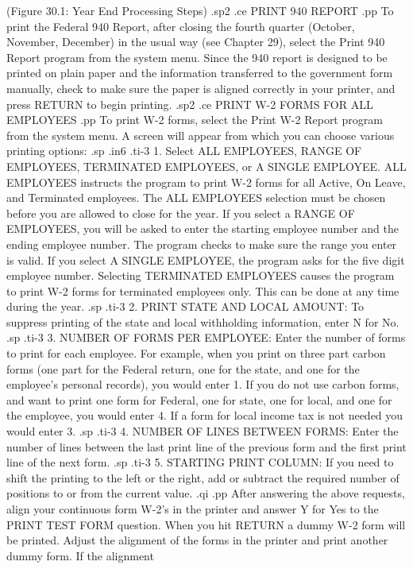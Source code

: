 	      (Figure 30.1: Year End Processing Steps)
.sp2
.ce
PRINT 940 REPORT
.pp
To print the Federal 940 Report, after
closing the fourth quarter (October, November, December) in the usual
way (see Chapter 29), select the Print 940 Report program from the system
menu.  Since the 940 report is designed to be printed on plain paper and
the information
transferred to the government form manually, check to make sure the
paper is aligned correctly in your printer, and press RETURN to begin
printing.
.sp2
.ce
PRINT W-2 FORMS FOR ALL EMPLOYEES
.pp
To print W-2 forms, select the Print W-2 Report program from the system
menu.  A screen will appear from which you can choose various printing
options:
.sp
.in6
.ti-3
1. Select ALL EMPLOYEES, RANGE OF EMPLOYEES, TERMINATED EMPLOYEES, or
A SINGLE EMPLOYEE.  ALL EMPLOYEES instructs the program to print W-2
forms for all Active, On Leave, and Terminated employees.  The ALL
EMPLOYEES selection must be chosen before you are allowed to close for
the year.
If you
select a RANGE OF EMPLOYEES, you will be asked to enter the starting
employee number and the ending employee number.  The program checks
to make sure the range you enter is valid.  If you select A SINGLE
EMPLOYEE, the program asks for the five digit employee number. Selecting
TERMINATED EMPLOYEES causes the program to print W-2 forms for terminated
employees only. This can be done at any time during the year.
.sp
.ti-3
2. PRINT STATE AND LOCAL AMOUNT: To suppress printing of the
state and local withholding information, enter N for No.
.sp
.ti-3
3. NUMBER OF FORMS PER EMPLOYEE: Enter the number of forms to
print for each employee.  For example, when you print on three
part carbon forms (one part for the Federal return,
one for the state, and one
for the employee's personal records), you would enter 1.  If you
do not use carbon forms, and want to print one form for Federal, one for
state, one for local, and one for the employee, you would enter 4.
If a form for local income tax is not needed you would enter 3.
.sp
.ti-3
4. NUMBER OF LINES BETWEEN FORMS: Enter the number of lines between the
last print line of the previous form and the first print line of the
next form.
.sp
.ti-3
5. STARTING PRINT COLUMN: If you need to shift the
printing to the left or the right, add or subtract the required number
of positions to or from the current value.
.qi
.pp
After answering the above requests, align your continuous form W-2's
in the printer and answer Y for Yes to the PRINT TEST FORM question.
When you hit RETURN a dummy W-2 form will be printed.  Adjust the alignment
of the forms in the printer and print another dummy form.  If the alignment
